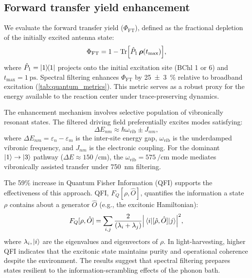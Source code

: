 \documentclass[journal=jpcl,manuscript=letter]{achemso}
\begin{document}
\subsection*{Forward transfer yield enhancement}

We evaluate the forward transfer yield ($\Phi_{\mathrm{FT}}$), defined as the fractional depletion of the initially excited antenna state:
\begin{equation}
\Phi_{\mathrm{FT}} = 1 - \Tr[\hat{P}_{1}\,\vb*{\rho}(t_{\max})],
\label{eq:ETE}
\end{equation}
where $\hat{P}_{1} = \dyad{1}$ projects onto the initial excitation site (BChl 1 or 6) and $t_{\max} = \SI{1}{\pico\second}$. Spectral filtering enhances $\Phi_{\mathrm{FT}}$ by \SI{25(3)}{\percent} relative to broadband excitation (\cref{tab:quantum_metrics}). This metric serves as a robust proxy for the energy available to the reaction center under trace-preserving dynamics.

The enhancement mechanism involves selective population of vibronically resonant states. The filtered driving field preferentially excites modes satisfying:
\begin{equation}
\Delta E_{nm} \approx \hbar\omega_{\mathrm{vib}} \pm J_{nm},
\label{eq:resonance_condition}
\end{equation}
where $\Delta E_{nm} = \varepsilon_n - \varepsilon_m$ is the inter-site energy gap, $\omega_{\mathrm{vib}}$ is the underdamped vibronic frequency, and $J_{nm}$ is the electronic coupling. For the dominant $\ket{1} \to \ket{3}$ pathway ($\Delta E \approx \SI{150}{\per\centi\meter}$), the $\omega_{\mathrm{vib}} = \SI{575}{\per\centi\meter}$ mode mediates vibronically assisted transfer under \SI{750}{\nano\meter} filtering.\cite{Chin2013,Fleming2015,Scholes2015}

The 59\% increase in Quantum Fisher Information (QFI) supports the effectiveness of this approach. QFI, $F_Q[\rho, \hat{O}]$, quantifies the information a state $\rho$ contains about a generator $\hat{O}$ (e.g., the excitonic Hamiltonian):
\begin{equation}
F_Q[\rho, \hat{O}] = \sum_{i,j} \frac{2}{(\lambda_i + \lambda_j)} \abs{\mel{i}{[\hat{\rho}, \hat{O}]}{j}}^2,
\label{eq:QFI}
\end{equation}
where $\lambda_i, \ket{i}$ are the eigenvalues and eigenvectors of $\rho$. In light-harvesting, higher QFI indicates that the excitonic state maintains purity and operational coherence despite the environment.\cite{Pezze2009} The results suggest that spectral filtering prepares states resilient to the information-scrambling effects of the phonon bath.
\end{document}
